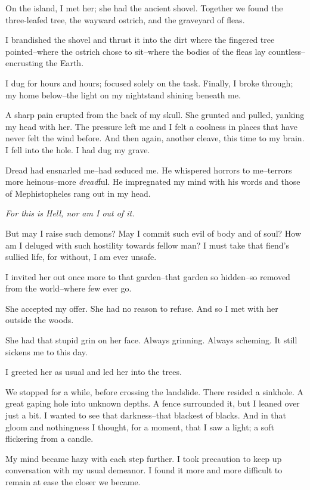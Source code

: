 \documentclass{article}
\begin{document}
On the island, I met her; she had the ancient shovel.
Together we found the three-leafed tree, the
wayward ostrich, and the graveyard of fleas.


I brandished the shovel and thrust it into the dirt
where the fingered tree pointed--where the ostrich
chose to sit--where the bodies of the fleas lay
countless--encrusting the Earth.


I dug for hours and hours; focused solely on the task.
Finally, I broke through; my home below--the
light on my nightstand shining beneath me.


A sharp pain erupted from the back of my skull.
She grunted and pulled, yanking my head with her.
The pressure left me and I felt a coolness in
places that have never felt the wind before.
And then again, another cleave, this time to my brain.
I fell into the hole. I had dug my grave.
\vvvv


\noindent
Dread had ensnarled me--had seduced me.
He whispered horrors to me--terrors
more heinous--more \textit{dread}ful.
He impregnated my mind with his words and
those of Mephistopheles rang out in my head.
\VV


\textit{For this is Hell, nor am I out of it.}
\VV


\noindent
But may I raise such demons?
May I commit such evil of body and of soul?
How am I deluged with such hostility towards fellow man?
I must take that fiend's sullied life,
for without, I am ever unsafe.
\VV


\noindent
I invited her out once more to that garden--that
garden so hidden--so removed from the world--where
few ever go. %


She accepted my offer.
She had no reason to refuse.
And so I met with her outside the woods.


She had that stupid grin on her face.
Always grinning. Always scheming.
It still sickens me to this day.


I greeted her as usual and led her into the trees.


We stopped for a while, before crossing the landslide.
There resided a sinkhole.
A great gaping hole into unknown depths.
A fence surrounded it,
but I leaned over just a bit.
I wanted to see that darkness--that
blackest of blacks.
And in that gloom and nothingness I thought, for a moment,
that I saw a light; a soft flickering from a candle.


My mind became hazy with each step further.
I took precaution to keep up conversation with my usual demeanor.
I found it more and more difficult to remain at ease the closer we became.
\end{document}
